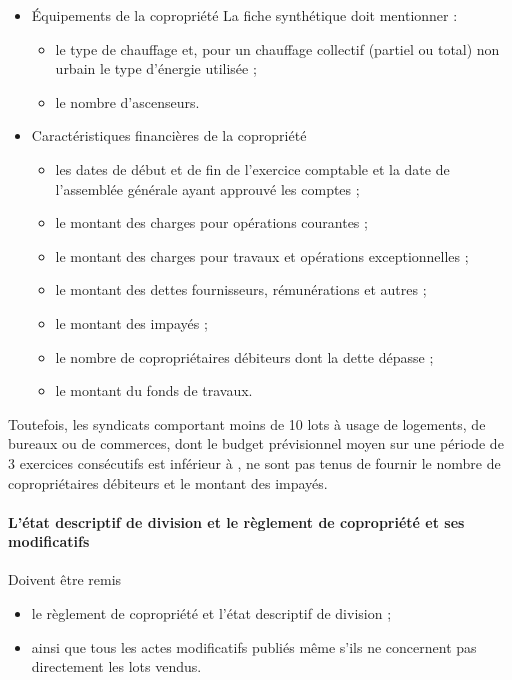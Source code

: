 \begin{itemize}
				\item  Équipements de la copropriété
					La fiche synthétique doit mentionner :
					\begin{itemize}
						\item le type de chauffage et, pour un chauffage collectif (partiel ou total) non urbain le type d'énergie utilisée ;
						\item le nombre d'ascenseurs.
					\end{itemize}
				
				\item  Caractéristiques financières de la copropriété
					\begin{itemize}
						\item les dates de début et de fin de l'exercice comptable et la date de l'assemblée générale ayant approuvé les comptes ;
						\item le montant des charges pour opérations courantes ;
						\item le montant des charges pour travaux et opérations exceptionnelles ;
						\item le montant des dettes fournisseurs, rémunérations et autres ;
						\item le montant des impayés ;
						\item le nombre de copropriétaires débiteurs dont la dette dépasse  ;
						\item le montant du fonds de travaux.
					\end{itemize}
			\end{itemize}
			
			Toutefois, les syndicats comportant moins de 10 lots à usage de logements, de bureaux ou de commerces,
			dont le budget prévisionnel moyen sur une période de 3 exercices consécutifs est inférieur à , ne
			sont pas tenus de fournir le nombre de copropriétaires débiteurs et le montant des impayés.
			
			\paragraph{L’état descriptif de division et le règlement de copropriété et ses modificatifs}
			Doivent être remis
			\begin{itemize}
				\item le règlement de copropriété et l’état descriptif de division ;
				\item ainsi que tous les actes modificatifs publiés même s’ils ne concernent pas directement les lots
			vendus.
			\end{itemize}
			
